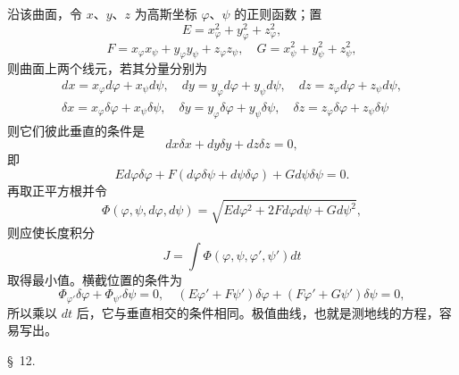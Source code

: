 \documentclass[11pt,a4paper,leqno]{article}
\begin{document}
沿该曲面，令 $x$、$y$、$z$ 为高斯坐标 $\varphi$、$\psi$ 的正则函数；置
\[
E=x_\varphi^2+y_\varphi^2+z_\varphi^2,
\]
\[
F=x_\varphi x_\psi+y_\varphi y_\psi+z_\varphi z_\psi,\quad
G=x_\psi^2+y_\psi^2+z_\psi^2,
\]
则曲面上两个线元，若其分量分别为
\[
\begin{gathered}
dx=x_\varphi d\varphi+x_\psi d\psi,\quad dy=y_\varphi d\varphi+y_\psi d\psi,\quad dz=z_\varphi d\varphi+z_\psi d\psi,\\
\delta x=x_\varphi \delta\varphi+x_\psi \delta\psi,\quad \delta y=y_\varphi \delta\varphi+y_\psi \delta\psi,\quad \delta z=z_\varphi \delta\varphi+z_\psi \delta\psi
\end{gathered}
\]
则它们彼此垂直的条件是
\[
dx\delta x+dy\delta y+dz\delta z=0,
\]
即
\[
Ed\varphi\delta\varphi+F(d\varphi\delta\psi+d\psi\delta\varphi)+Gd\psi\delta\psi=0.
\]
再取正平方根并令
\[
\Phi(\varphi,\psi,d\varphi,d\psi)=\sqrt{Ed\varphi^2+2Fd\varphi d\psi+Gd\psi^2},
\]
则应使长度积分
\[
J=\int \Phi(\varphi,\psi,\varphi',\psi')dt
\]
取得最小值。横截位置的条件为
\[
\Phi_{\varphi'}\delta\varphi+\Phi_{\psi'}\delta\psi=0,\quad
(E\varphi'+F\psi')\delta\varphi+(F\varphi'+G\psi')\delta\psi=0,
\]
所以乘以 $dt$ 后，它与垂直相交的条件相同。极值曲线，也就是测地线的方程，容易写出。

\begin{center}{\large \S~12.}\end{center}
\end{document}
